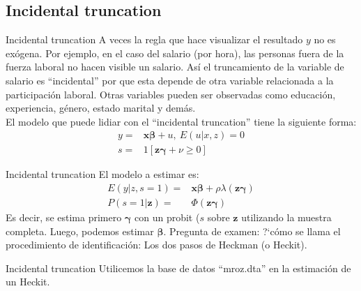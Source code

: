 \subsection{Incidental truncation} 
\begin{frame}{Incidental truncation}
	A veces la regla que hace visualizar el resultado $y$ no es exógena. Por ejemplo, en el caso del salario (por hora), las personas fuera de la fuerza laboral no hacen visible un salario. Así el truncamiento de la variable de salario es ``incidental'' por que esta depende de otra variable relacionada a la participación laboral. Otras variables pueden ser observadas como educación, experiencia, g\'{e}nero, estado marital y demás. \\
	El modelo que puede lidiar con el ``incidental truncation'' tiene la siguiente forma:
		\begin{align}
			y=&\boldsymbol{x\beta}+u, \ E(u | x,z)=0 \\
			s=&1[\boldsymbol{z\gamma}+\nu\ge 0]
		\end{align}
\end{frame}
\begin{frame}{Incidental truncation}
	El modelo a estimar es:
		\begin{align}
			E(y|z,s=1)=&\boldsymbol{x\beta}+\rho\lambda(\boldsymbol{z\gamma}) \\
			P(s=1|\boldsymbol{z})=&\Phi (\boldsymbol{z\gamma})
		\end{align}
	Es decir, se estima primero $\boldsymbol{\gamma}$ con un probit ($s$ sobre $\boldsymbol{z}$ utilizando la muestra completa. Luego, podemos estimar $\boldsymbol{\beta}$. Pregunta de examen: ?`cómo se llama el procedimiento de identificación: Los dos pasos de Heckman (o Heckit). 
\end{frame}
\begin{frame}{Incidental truncation}
	Utilicemos la base de datos ``mroz.dta'' en la estimación de un Heckit.
\end{frame}